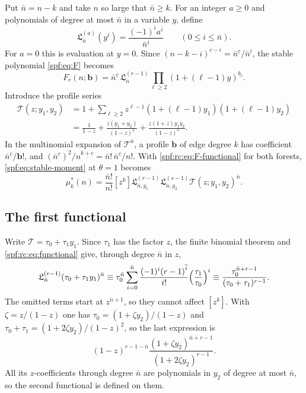 \documentclass[11pt]{article}
\numberwithin{equation}{section}
\theoremstyle{definition}
\theoremstyle{remark}
\theoremstyle{definition}
\newcommand{\fall}[2]{{#1}^{\underline{#2}}}
\newcommand{\rise}[2]{{#1}^{\overline{#2}}}
\newcommand{\bfac}{\mathbf b!}
\begin{document}
Put $\bar n=n-k$ and take $n$ so large that $\bar n\ge k$. For an integer
$a\ge0$ and polynomials of degree at most $\bar n$ in a variable $y$, define
\begin{equation}
 \mathfrak L_{\bar n}^{(a)}(y^i)=
       \frac{(-1)^i\rise ai}{\fall{\bar n}i}\qquad(0\le i\le\bar n).
 \label{spf:rc:eq:functional}
\end{equation}
For $a=0$ this is evaluation at $y=0$. Since
$\fall{(n-k-i)}{c-i}=\fall{\bar n}c/\fall{\bar n}i$, the stable polynomial
\eqref{spf:eq:F} becomes
\begin{equation}
 F_r(n;\mathbf b)=\fall{\bar n}c\,
       \mathfrak L_{\bar n}^{(r-1)}\prod_{\ell\ge2}(1+(\ell-1)y)^{b_\ell}.
 \label{spf:rc:eq:F-functional}
\end{equation}
Introduce the profile series
\begin{equation}
 \begin{split}
 \mathcal T(z;y_1,y_2)
 &=1+\sum_{\ell\ge2}z^{\ell-1}(1+(\ell-1)y_1)(1+(\ell-1)y_2)\\
 &=\frac1{1-z}+\frac{z(y_1+y_2)}{(1-z)^2}
                     +\frac{z(1+z)y_1y_2}{(1-z)^3}.
 \end{split}
 \label{spf:rc:eq:T}
\end{equation}
In the multinomial expansion of $\mathcal T^{\bar n}$, a profile $\mathbf b$
of edge degree $k$ has coefficient $\fall{\bar n}c/\bfac$, and
$(\fall{\bar n}c)^2/\fall n{k+c}=\bar n!\,\fall{\bar n}c/n!$. With
\eqref{spf:rc:eq:F-functional} for both forests, \eqref{spf:eq:stable-moment}
at $\theta=1$ becomes
\begin{equation}
 \mu_k^*(n)=\frac{\bar n!}{n!}[z^k]
       \mathfrak L_{\bar n,y_1}^{(r-1)}\mathfrak L_{\bar n,y_2}^{(s-1)}
       \mathcal T(z;y_1,y_2)^{\bar n}.
 \label{spf:rc:eq:master}
\end{equation}

\subsection{The first functional}

Write $\mathcal T=\tau_0+\tau_1y_1$. Since $\tau_1$ has the factor $z$, the
finite binomial theorem and \eqref{spf:rc:eq:functional} give, through
degree $\bar n$ in $z$,
\begin{equation}
 \mathfrak L_{\bar n}^{(r-1)}(\tau_0+\tau_1y_1)^{\bar n}
 \equiv\tau_0^{\bar n}\sum_{i=0}^{\bar n}\frac{(-1)^i\rise{(r-1)}i}{i!}
   \Bigl(\frac{\tau_1}{\tau_0}\Bigr)^i
 \equiv\frac{\tau_0^{\bar n+r-1}}{(\tau_0+\tau_1)^{r-1}}.
 \label{spf:rc:eq:first-functional}
\end{equation}
The omitted terms start at $z^{\bar n+1}$, so they cannot affect $[z^k]$.
With $\zeta=z/(1-z)$ one has $\tau_0=(1+\zeta y_2)/(1-z)$ and
$\tau_0+\tau_1=(1+2\zeta y_2)/(1-z)^2$, so the last expression is
\begin{equation}
 (1-z)^{r-1-\bar n}\frac{(1+\zeta y_2)^{\bar n+r-1}}{(1+2\zeta y_2)^{r-1}}.
 \label{spf:rc:eq:first-simplified}
\end{equation}
All its $z$-coefficients through degree $\bar n$ are polynomials in $y_2$ of
degree at most $\bar n$, so the second functional is defined on them.
\end{document}
